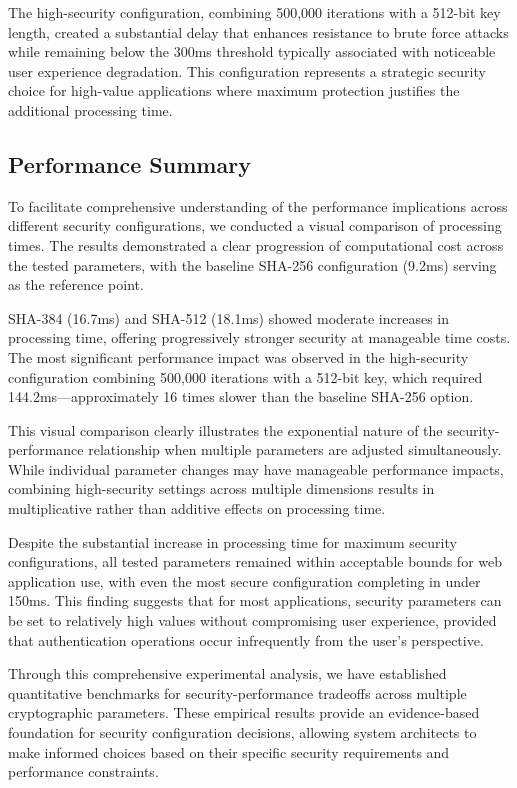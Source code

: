 \documentclass[11pt,a4paper]{article}
\begin{document}
The high-security configuration, combining 500,000 iterations with a 512-bit key length, created a substantial delay that enhances resistance to brute force attacks while remaining below the 300ms threshold typically associated with noticeable user experience degradation. This configuration represents a strategic security choice for high-value applications where maximum protection justifies the additional processing time.
\subsection{Performance Summary}
To facilitate comprehensive understanding of the performance implications across different security configurations, we conducted a visual comparison of processing times. The results demonstrated a clear progression of computational cost across the tested parameters, with the baseline SHA-256 configuration (9.2ms) serving as the reference point.

SHA-384 (16.7ms) and SHA-512 (18.1ms) showed moderate increases in processing time, offering progressively stronger security at manageable time costs. The most significant performance impact was observed in the high-security configuration combining 500,000 iterations with a 512-bit key, which required 144.2ms—approximately 16 times slower than the baseline SHA-256 option.

This visual comparison clearly illustrates the exponential nature of the security-performance relationship when multiple parameters are adjusted simultaneously. While individual parameter changes may have manageable performance impacts, combining high-security settings across multiple dimensions results in multiplicative rather than additive effects on processing time.

Despite the substantial increase in processing time for maximum security configurations, all tested parameters remained within acceptable bounds for web application use, with even the most secure configuration completing in under 150ms. This finding suggests that for most applications, security parameters can be set to relatively high values without compromising user experience, provided that authentication operations occur infrequently from the user's perspective.

Through this comprehensive experimental analysis, we have established quantitative benchmarks for security-performance tradeoffs across multiple cryptographic parameters. These empirical results provide an evidence-based foundation for security configuration decisions, allowing system architects to make informed choices based on their specific security requirements and performance constraints.
\end{document}

